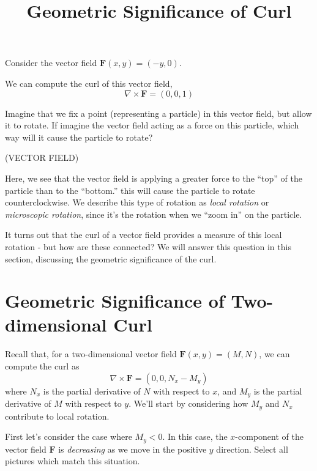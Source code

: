 \documentclass{ximera}
\title{Geometric Significance of Curl}
\begin{document}
  
\begin{abstract}  
\end{abstract}  
\maketitle 

Consider the vector field $\mathbf{F}(x,y)=(-y,0)$.

We can compute the curl of this vector field, 
\[
\nabla\times\mathbf{F}=(0,0,1)
\]

Imagine that we fix a point (representing a particle) in this vector field, but allow it to rotate. If imagine the vector field acting as a force on this particle, which way will it cause the particle to rotate?

(VECTOR FIELD)

Here, we see that the vector field is applying a greater force to the ``top'' of the particle than to the ``bottom.'' this will cause the particle to rotate counterclockwise. We describe this type of rotation as \emph{local rotation} or \emph{microscopic rotation}, since it's the rotation when we ``zoom in'' on the particle.

It turns out that the curl of a vector field provides a measure of this local rotation - but how are these connected? We will answer this question in this section, discussing the geometric significance of the curl.

\section*{Geometric Significance of Two-dimensional Curl}

Recall that, for a two-dimensional vector field $\mathbf{F}(x,y)=(M,N)$, we can compute the curl as
\[
\nabla\times\mathbf{F} = (0,0,N_x-M_y)
\]
where $N_x$ is the partial derivative of $N$ with respect to $x$, and $M_y$ is the partial derivative of $M$ with respect to $y$. We'll start by considering how $M_y$ and $N_x$ contribute to local rotation.

First let's consider the case where $M_y<0$. In this case, the $x$-component of the vector field $\mathbf{F}$ is \emph{decreasing} as we move in the positive $y$ direction. Select all pictures which match this situation.
\end{document}
